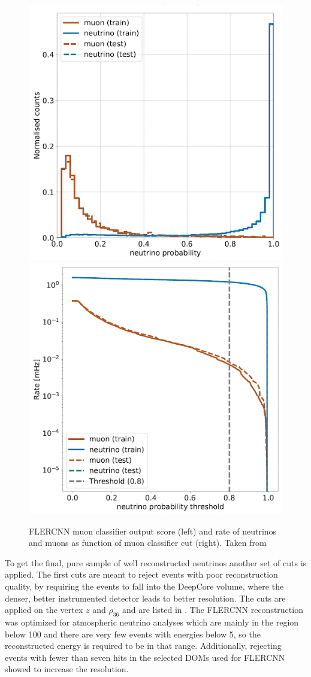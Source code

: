 \begin{figure}
\includegraphics[width=0.49\linewidth]{figures/simulation_and_processing/flercnn/flercnn_muon_classifier.png}
\includegraphics[width=0.49\linewidth]{figures/simulation_and_processing/flercnn/flercnn_muon_classifier_rate_vs_threshold.png}
\caption[FLERCNN muon classifier probability distributions]{FLERCNN muon classifier output score (left) and rate of neutrinos and muons as function of muon classifier cut (right). Taken from \cite{flercnn_analysis_internal_note}}
\end{figure}


To get the final, pure sample of well reconstructed neutrinos another set of cuts is applied. The first cuts are meant to reject events with poor reconstruction quality, by requiring the events to fall into the DeepCore volume, where the denser, better instrumented detector leads to better resolution. The cuts are applied on the vertex $z$ and $\rho_{36}$ and are listed in . The FLERCNN reconstruction was optimized for atmospheric neutrino analyses which are mainly in the region below \SI{100}{\gev} and there are very few events with energies below \SI{5}{\gev}, so the reconstructed energy is required to be in that range. Additionally, rejecting events with fewer than seven hits in the selected DOMs used for FLERCNN showed to increase the resolution.


